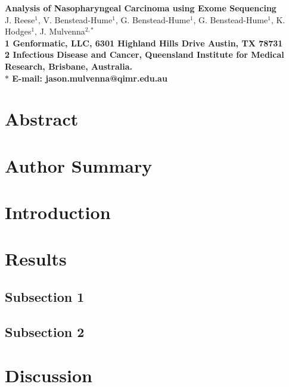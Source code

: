 \documentclass[10pt]{article}
\date{}
\begin{document}
\begin{flushleft}
{\Large
\textbf{Analysis of Nasopharyngeal Carcinoma using Exome Sequencing}
}
\\
J. Reese$^{1}$, 
V. Benstead-Hume$^{1}$, 
G. Benstead-Hume$^{1}$,
G. Benstead-Hume$^{1}$,
K. Hodges$^{1}$,
J. Mulvenna$^{2,\ast}$
\\
\bf{1} Genformatic, LLC, 6301 Highland Hills Drive Austin, TX 78731
\\
\bf{2} Infectious Disease and Cancer, Queensland Institute for Medical Research, Brisbane, Australia.
\\
$\ast$ E-mail: jason.mulvenna@qimr.edu.au
\end{flushleft}

\section*{Abstract}

\section*{Author Summary}

\section*{Introduction}

\section*{Results}

\subsection*{Subsection 1}

\subsection*{Subsection 2}

\section*{Discussion}
\end{document}
